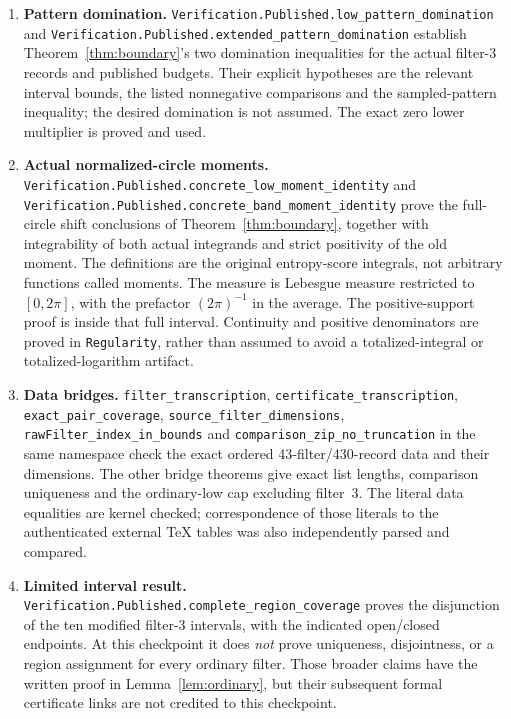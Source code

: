 \begin{enumerate}
\item \textbf{Pattern domination.}
\nolinkurl{Verification.Published.low_pattern_domination} and
\nolinkurl{Verification.Published.extended_pattern_domination}
establish Theorem~\ref{thm:boundary}'s two domination inequalities
for the actual filter-3 records and published budgets. Their explicit
hypotheses are the relevant interval bounds, the listed nonnegative
comparisons and the sampled-pattern inequality; the desired domination
is not assumed. The exact zero lower multiplier is proved and used.
\item \textbf{Actual normalized-circle moments.}
\nolinkurl{Verification.Published.concrete_low_moment_identity} and
\nolinkurl{Verification.Published.concrete_band_moment_identity}
prove the full-circle shift conclusions of Theorem~\ref{thm:boundary},
together with integrability of both actual integrands and strict
positivity of the old moment. The definitions are the original
entropy-score integrals, not arbitrary functions called moments.
The measure is Lebesgue measure restricted to $[0,2\pi]$, with
the prefactor $(2\pi)^{-1}$ in the average. The positive-support proof
is inside that full interval. Continuity and positive denominators
are proved in \texttt{Regularity}, rather than assumed to avoid a
totalized-integral or totalized-logarithm artifact.
\item \textbf{Data bridges.}
\nolinkurl{filter_transcription}, \nolinkurl{certificate_transcription},
\nolinkurl{exact_pair_coverage}, \nolinkurl{source_filter_dimensions},
\nolinkurl{rawFilter_index_in_bounds} and
\nolinkurl{comparison_zip_no_truncation} in the same namespace
check the exact ordered 43-filter/430-record data and their dimensions.
The other bridge theorems give exact list lengths, comparison uniqueness
and the ordinary-low cap excluding filter~3. The literal data equalities
are kernel checked; correspondence of those literals to the authenticated
external TeX tables was also independently parsed and compared.
\item \textbf{Limited interval result.}
\nolinkurl{Verification.Published.complete_region_coverage} proves the
disjunction of the ten modified filter-3 intervals, with the indicated
open/closed endpoints. At this checkpoint it does \emph{not} prove
uniqueness, disjointness, or a region assignment for every ordinary
filter. Those broader claims have the written proof in
Lemma~\ref{lem:ordinary}, but their subsequent formal certificate links
are not credited to this checkpoint.
\end{enumerate}

